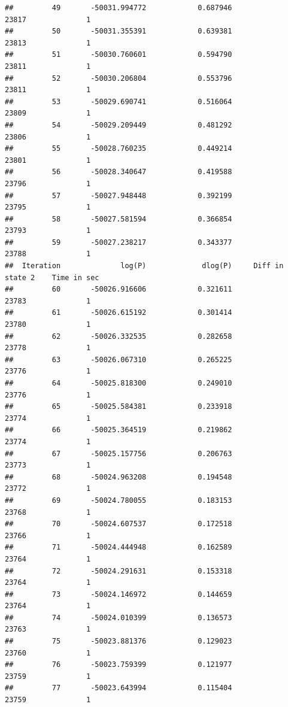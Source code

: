 \documentclass[11pt]{article}\usepackage[]{graphicx}\usepackage[]{color}
\makeatletter
\newenvironment{kframe}{%
 \def\at@end@of@kframe{}%
 \ifinner\ifhmode%
  \def\at@end@of@kframe{\end{minipage}}%
  \begin{minipage}{\columnwidth}%
 \fi\fi%
 \def\FrameCommand##1{\hskip\@totalleftmargin \hskip-\fboxsep
 \colorbox{shadecolor}{##1}\hskip-\fboxsep
     \hskip-\linewidth \hskip-\@totalleftmargin \hskip\columnwidth}%
 \MakeFramed {\advance\hsize-\width
   \@totalleftmargin\z@ \linewidth\hsize
   \@setminipage}}%
 {\par\unskip\endMakeFramed%
 \at@end@of@kframe}
\newenvironment{knitrout}{}{} %
\makeatother
\begin{document}
\begin{scriptsize}
\begin{knitrout}
\begin{kframe}
\begin{verbatim}
##         49       -50031.994772            0.687946               23817              1
##         50       -50031.355391            0.639381               23813              1
##         51       -50030.760601            0.594790               23811              1
##         52       -50030.206804            0.553796               23811              1
##         53       -50029.690741            0.516064               23809              1
##         54       -50029.209449            0.481292               23806              1
##         55       -50028.760235            0.449214               23801              1
##         56       -50028.340647            0.419588               23796              1
##         57       -50027.948448            0.392199               23795              1
##         58       -50027.581594            0.366854               23793              1
##         59       -50027.238217            0.343377               23788              1
##  Iteration              log(P)             dlog(P)     Diff in state 2    Time in sec
##         60       -50026.916606            0.321611               23783              1
##         61       -50026.615192            0.301414               23780              1
##         62       -50026.332535            0.282658               23778              1
##         63       -50026.067310            0.265225               23776              1
##         64       -50025.818300            0.249010               23776              1
##         65       -50025.584381            0.233918               23774              1
##         66       -50025.364519            0.219862               23774              1
##         67       -50025.157756            0.206763               23773              1
##         68       -50024.963208            0.194548               23772              1
##         69       -50024.780055            0.183153               23768              1
##         70       -50024.607537            0.172518               23766              1
##         71       -50024.444948            0.162589               23764              1
##         72       -50024.291631            0.153318               23764              1
##         73       -50024.146972            0.144659               23764              1
##         74       -50024.010399            0.136573               23763              1
##         75       -50023.881376            0.129023               23760              1
##         76       -50023.759399            0.121977               23759              1
##         77       -50023.643994            0.115404               23759              1

\end{verbatim}
\end{kframe}
\end{knitrout}
\end{scriptsize}
\end{document}
